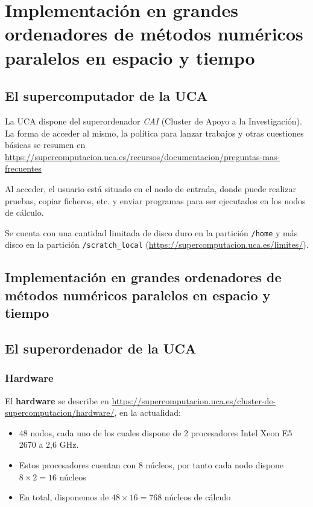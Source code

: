 
\section{Implementación en grandes ordenadores de métodos numéricos paralelos en espacio y tiempo}

\subsection{El supercomputador de la UCA}
\label{sec:supercomputador-UCA}
La UCA dispone del superordenador \textit{CAI} (Cluster de Apoyo a la
Investigación).  La forma de acceder al mismo, la política para lanzar
trabajos y otras cuestiones básicas se resumen en
\url{https://supercomputacion.uca.es/recursos/documentacion/preguntas-mas-frecuentes}

Al acceder, el usuario está situado en el nodo de entrada, donde puede
realizar pruebas, copiar ficheros, etc. y enviar programas para ser
ejecutados en los nodos de cálculo.

Se cuenta con una cantidad limitada de disco duro en la partición
\texttt{/home} y más disco en la partición \texttt{/scratch\_local}
(\url{https://supercomputacion.uca.es/limites/}).

\subsection{Implementación en grandes ordenadores de métodos numéricos paralelos en espacio y tiempo}

\subsection{El superordenador de la UCA}

\subsubsection*{Hardware}
El \textbf{hardware} se describe en
\url{https://supercomputacion.uca.es/cluster-de-supercomputacion/hardware/},
en la actualidad:
\begin{itemize}
\item 48 nodos, cada uno de los cuales dispone de 2 procesadores Intel Xeon E5 2670 a 2,6 GHz.
\item Estos procesadores cuentan con 8 núcleos, por tanto cada nodo dispone $8\times 2=16$ núcleos
\item En total, disponemos de $48\times 16=768$ núcleos de cálculo
\end{itemize}

